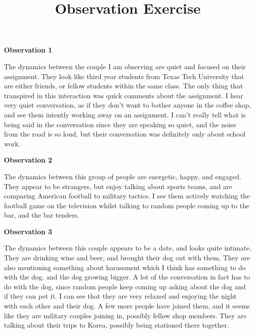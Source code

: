 \documentclass[12pt]{article}
\begin{document}
\title{Observation Exercise}




\par{\textbf{Observation 1}}
\par
The dynamics between the couple I am observing are quiet and focused on their assignment. They look like third year students from Texas Tech University that are either friends, or fellow students within the same class. The only thing that transpired in this interaction was quick comments about the assignment. I hear very quiet conversation, as if they don't want to bother anyone in the coffee shop, and see them intently working away on an assignment. I can't really tell what is being said in the conversation since they are speaking so quiet, and the noise from the road is so loud, but their conversation was definitely only about school work.
\par{\textbf{Observation 2}}
\par
The dynamics between this group of people are energetic, happy, and engaged. They appear to be strangers, but enjoy talking about sports teams, and are comparing American football to military tactics. I see them actively watching the football game on the television whilst talking to random people coming up to the bar, and the bar tenders.
\par{\textbf{Observation 3}}
\par
The dynamics between this couple appears to be a date, and looks quite intimate. They are drinking wine and beer, and brought their dog out with them. They are also mentioning something about harassment which I think has something to do with the dog, and the dog growing bigger. A lot of the conversation in fact has to do with the dog, since random people keep coming up asking about the dog and if they can pet it. I can see that they are very relaxed and enjoying the night with each other and their dog. A few more people have joined them, and it seems like they are military couples joining in, possibly fellow shop members. They are talking about their trips to Korea, possibly being stationed there together.
\end{document}

